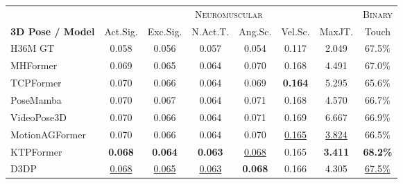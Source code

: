 \begin{table}[t]
\begin{tabular}{l ccc ccccccc}
\bottomrule
\end{tabular}

\vspace{12pt}

\begin{tabular}{l cccccc c}
\toprule
& \multicolumn{6}{c}{\textsc{Neuromuscular}}
& \textsc{Binary} \\
\cmidrule(lr){2-7} \cmidrule(lr){8-8}
\textbf{3D Pose / Model}
& Act.Sig. & Exc.Sig. & N.Act.T. & Ang.Sc. & Vel.Sc. & MaxJT.
& Touch \\
\midrule
H36M GT
  & 0.058 & 0.056 & 0.057 & 0.054 & 0.117 & 2.049 & 67.5\% \\
\midrule

MHFormer
  & 0.069  & 0.065  & 0.064  & 0.070  & 0.168  & 4.491  & 67.0\% \\

TCPFormer
  & 0.070  & 0.066  & 0.064  & 0.069  & \textbf{0.164}  & 5.295  & 65.6\% \\

PoseMamba
  & 0.070  & 0.067  & 0.064  & 0.071  & 0.168  & 4.570  & 66.7\% \\

VideoPose3D
  & 0.070  & 0.066  & 0.064  & 0.071  & 0.169  & 6.667  & 66.9\% \\

MotionAGFormer
  & 0.070  & 0.066  & 0.064  & 0.070  & \underline{0.165}  & \underline{3.824}  & 66.5\% \\

KTPFormer
  & \textbf{0.068}  & \textbf{0.064}  & \textbf{0.063}  & \underline{0.068}  & 0.165  & \textbf{3.411}  & \textbf{68.2\%} \\

D3DP
  & \underline{0.068}  & \underline{0.065}  & \underline{0.063}  & \textbf{0.068}  & 0.166  & 4.305  & \underline{67.5\%} \\

\bottomrule
\end{tabular}

\end{table}